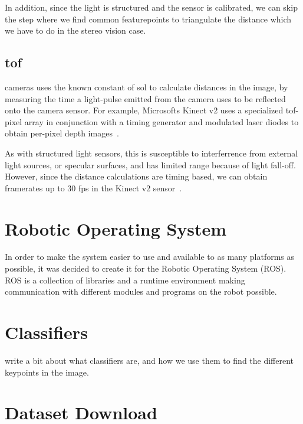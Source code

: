 \begin{appendices}
In addition, since the light is structured and the sensor is calibrated, we can skip the step where we find common featurepoints to triangulate the distance which we have to do in the stereo vision case.

\subsection{\acrlong{tof}} cameras uses the known constant of \gls{sol} to calculate distances in the image, by measuring the time a light-pulse emitted from the camera uses to be reflected onto the camera sensor. For example, Microsofts Kinect v2 uses a specialized \gls{tof}-pixel array in conjunction with a timing generator and modulated laser diodes to obtain per-pixel depth images~\cite{hotchipsTalk}.

As with structured light sensors, this is susceptible to interferrence from external light sources, or specular surfaces, and has limited range because of light fall-off. However, since the distance calculations are timing based, we can obtain framerates up to 30 fps in the Kinect v2 sensor~\cite{Lachat_2015}.



\section{Robotic Operating System}

In order to make the system easier to use and available to as many platforms as possible, it was decided to create it for the Robotic Operating System (ROS). ROS is a collection of libraries and a runtime environment making communication with different modules and programs on the robot possible. 

\section{Classifiers}

write a bit about what classifiers are, and how we use them to find the different keypoints in the image.

\section{Dataset Download}




\end{appendices}
